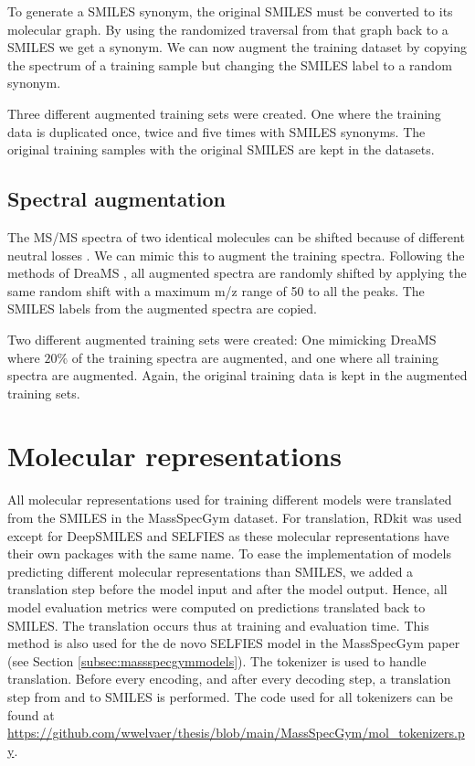 To generate a SMILES synonym, the original SMILES must be converted to its molecular graph. 
By using the randomized traversal from that graph back to a SMILES we get a synonym.
We can now augment the training dataset by copying the spectrum of a training sample but changing the SMILES label to a random synonym.

Three different augmented training sets were created. One where the training data is duplicated once, twice and five times with SMILES synonyms.
The original training samples with the original SMILES are kept in the datasets.

\subsection{Spectral augmentation}

The \ac{MS/MS} spectra of two identical molecules can be shifted because of different neutral losses \cite{bushuiev2024emergence}.
We can mimic this to augment the training spectra.
Following the methods of DreaMS \cite{bushuiev2024emergence}, all augmented spectra are randomly shifted by applying the same random shift with a maximum m/z range of 50 to all the peaks.
The SMILES labels from the augmented spectra are copied.

Two different augmented training sets were created:
One mimicking DreaMS where $20\%$ of the training spectra are augmented, and one where all training spectra are augmented.
Again, the original training data is kept in the augmented training sets.

\section{Molecular representations}
\label{sec:representations}

All molecular representations used for training different models were translated from the SMILES in the MassSpecGym dataset.
For translation, RDkit was used except for DeepSMILES and SELFIES as these molecular representations have their own packages with the same name.
To ease the implementation of models predicting different molecular representations than SMILES,
we added a translation step before the model input and after the model output.
Hence, all model evaluation metrics were computed on predictions translated back to SMILES.
The translation occurs thus at training and evaluation time.
This method is also used for the de novo SELFIES model in the MassSpecGym paper (see Section \ref{subsec:massspecgymmodels}).
The tokenizer is used to handle translation. Before every encoding, and after every decoding step, a translation step from and to SMILES is performed.
The code used for all tokenizers can be found at \url{https://github.com/wwelvaer/thesis/blob/main/MassSpecGym/mol_tokenizers.py}.

